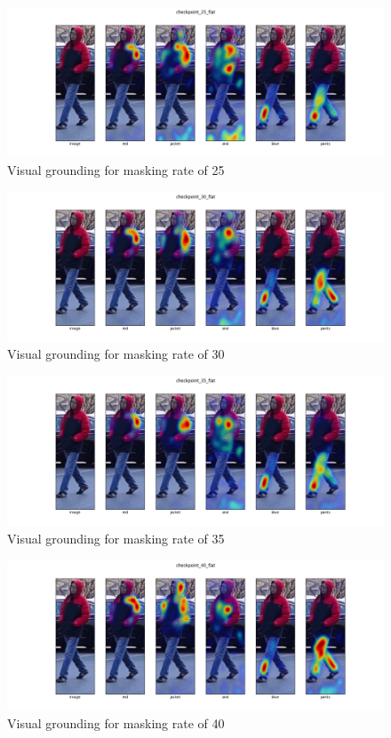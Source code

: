 \begin{figure}[htbp]
  \includegraphics[width=\linewidth]{img/mrtd_masking_ratio/mrtd-checkpoint_25_flat.png}
  \caption{Visual grounding for masking rate of 25} 
  \label{mtrd_3} 
\end{figure}

\begin{figure}[htbp]
  \includegraphics[width=\linewidth]{img/mrtd_masking_ratio/mrtd-checkpoint_30_flat.png}
  \caption{Visual grounding for masking rate of 30}
  \label{mtrd_4}
\end{figure}

\begin{figure}[htbp]
  \includegraphics[width=\linewidth]{img/mrtd_masking_ratio/mrtd-checkpoint_35_flat.png}
  \caption{Visual grounding for masking rate of 35}
  \label{mtrd_5}
\end{figure}

\begin{figure}[htbp]
  \includegraphics[width=\linewidth]{img/mrtd_masking_ratio/mrtd-checkpoint_40_flat.png}
  \caption{Visual grounding for masking rate of 40}
  \label{mtrd_6}
\end{figure}